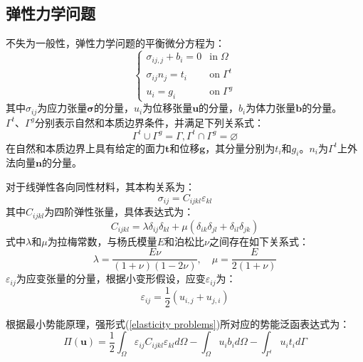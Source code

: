 \subsection{弹性力学问题}
不失为一般性，弹性力学问题的平衡微分方程为：
\begin{equation}\label{elasticity problems}
\begin{cases}
    \sigma_{ij,j}+b_i=0&\text{in}\;\Omega\\
    \sigma_{ij}n_j=t_i&\text{on}\;\Gamma^t\\
    u_i=g_i&\text{on}\;\Gamma^g
\end{cases}
\end{equation}
其中$\sigma_{ij}$为应力张量$\pmb \sigma$的分量，$u_i$为位移张量$\pmb{u}$的分量，$b_i$为体力张量$\pmb{b}$的分量。$\Gamma^t \text{、}\Gamma^g$分别表示自然和本质边界条件，并满足下列关系式：
\begin{equation}\label{EGeometric relationships}
\Gamma^t\cup \Gamma^g=\Gamma,\Gamma^t\cap \Gamma^g=\varnothing
\end{equation}
在自然和本质边界上具有给定的面力$\pmb{t}$和位移$\pmb{g}$，其分量分别为$t_i$和$g_i$。$n_i$为$\Gamma^{t}$上外法向量$\pmb{n}$的分量。\par
对于线弹性各向同性材料，其本构关系为：
\begin{equation}\label{constitutive relation}
    \sigma_{ij}=C_{ijkl}\varepsilon_{kl}
\end{equation}
其中$C_{ijkl}$为四阶弹性张量，具体表达式为：
\begin{equation}
    C_{ijkl}=\lambda\delta_{ij}\delta_{kl}+\mu(\delta_{ik}\delta_{jl}+\delta_{il}\delta_{jk})
\end{equation}
式中$\lambda$和$\mu$为拉梅常数，与杨氏模量$E$和泊松比$\nu$之间存在如下关系式：
\begin{equation}
    \lambda=\frac{E\nu}{(1+\nu)(1-2\nu)},\quad \mu=\frac{E}{2(1+\nu)}
\end{equation}
$\varepsilon_{ij}$为应变张量的分量，根据小变形假设，应变$\varepsilon_{ij}$为：
\begin{equation}\label{CH2-strain}
    \varepsilon_{ij}=\frac{1}{2}(u_{i,j}+u_{j,i})
\end{equation} \par
根据最小势能原理，强形式(\ref{elasticity problems})所对应的势能泛函表达式为：
\begin{equation}\label{elasticity potential functional}
    \Pi(\pmb{u})=\frac{1}{2}\int_{\Omega}\varepsilon_{ij}C_{ijkl}\varepsilon_{kl}d\Omega-\int_{\Omega}u_ib_id\Omega-\int_{\Gamma^t}u_it_id\Gamma
\end{equation}
